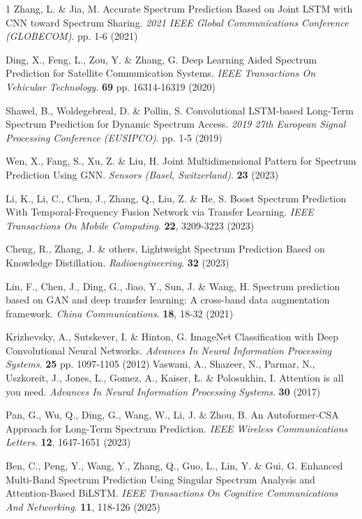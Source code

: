 \documentclass[lettersize,journal]{IEEEtran}
\begin{document}
\begin{thebibliography}{1}
Zhang, L. \& Jia, M. Accurate Spectrum Prediction Based on Joint LSTM with CNN toward Spectrum Sharing. {\em 2021 IEEE Global Communications Conference (GLOBECOM)}. pp. 1-6 (2021)

Ding, X., Feng, L., Zou, Y. \& Zhang, G. Deep Learning Aided Spectrum Prediction for Satellite Communication Systems. {\em IEEE Transactions On Vehicular Technology}. \textbf{69} pp. 16314-16319 (2020)

Shawel, B., Woldegebreal, D. \& Pollin, S. Convolutional LSTM-based Long-Term Spectrum Prediction for Dynamic Spectrum Access. {\em 2019 27th European Signal Processing Conference (EUSIPCO)}. pp. 1-5 (2019)

Wen, X., Fang, S., Xu, Z. \& Liu, H. Joint Multidimensional Pattern for Spectrum Prediction Using GNN. {\em Sensors (Basel, Switzerland)}. \textbf{23} (2023)

Li, K., Li, C., Chen, J., Zhang, Q., Liu, Z. \& He, S. Boost Spectrum Prediction With Temporal-Frequency Fusion Network via Transfer Learning. {\em IEEE Transactions On Mobile Computing}. \textbf{22}, 3209-3223 (2023)

Cheng, R., Zhang, J. \& others, Lightweight Spectrum Prediction Based on Knowledge Distillation. {\em Radioengineering}. \textbf{32} (2023)

Lin, F., Chen, J., Ding, G., Jiao, Y., Sun, J. \& Wang, H. Spectrum prediction based on GAN and deep transfer learning: A cross-band data augmentation framework. {\em China Communications}. \textbf{18}, 18-32 (2021)

Krizhevsky, A., Sutskever, I. \& Hinton, G. ImageNet Classification with Deep Convolutional Neural Networks. {\em Advances In Neural Information Processing Systems}. \textbf{25} pp. 1097-1105 (2012)
Vaswani, A., Shazeer, N., Parmar, N., Uszkoreit, J., Jones, L., Gomez, A., Kaiser, {\L}. \& Polosukhin, I. Attention is all you need. {\em Advances In Neural Information Processing Systems}. \textbf{30} (2017)

Pan, G., Wu, Q., Ding, G., Wang, W., Li, J. \& Zhou, B. An Autoformer-CSA Approach for Long-Term Spectrum Prediction. {\em IEEE Wireless Communications Letters}. \textbf{12}, 1647-1651 (2023)

Ben, C., Peng, Y., Wang, Y., Zhang, Q., Guo, L., Lin, Y. \& Gui, G. Enhanced Multi-Band Spectrum Prediction Using Singular Spectrum Analysis and Attention-Based BiLSTM. {\em IEEE Transactions On Cognitive Communications And Networking}. \textbf{11}, 118-126 (2025)


\end{thebibliography}
\end{document}
